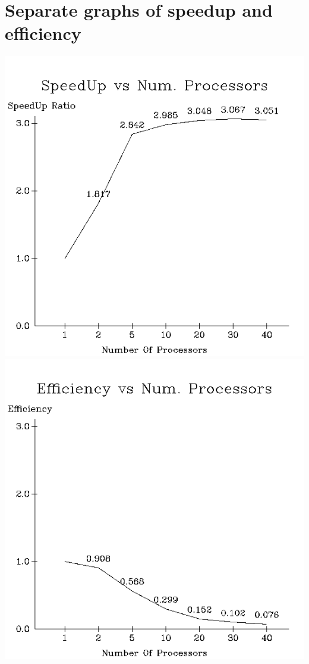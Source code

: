 \documentclass[a4paper,12pt]{article}
\begin{document}
\section{Separate graphs of speedup and efficiency}
\includegraphics[scale=0.75]{./speedup.png} \\
\includegraphics[scale=0.75]{./efficiency.png}
\end{document}
